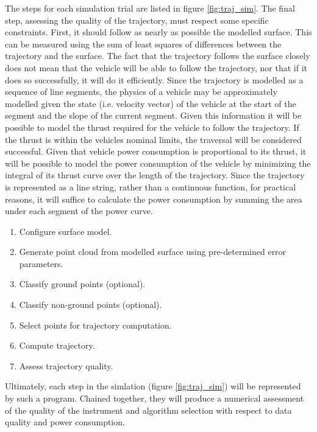 \documentclass[10pt]{report}
\begin{document}
The steps for each simulation trial are listed in figure \ref{fig:traj_sim}. The final step, assessing the quality of the trajectory, must respect some specific constraints. First, it should follow as nearly as possible the modelled surface. This can be measured using the sum of least squares of differences between the trajectory and the surface. The fact that the trajectory follows the surface closely does not mean that the vehicle will be able to follow the trajectory, nor that if it does so successfully, it will do it efficiently. Since the trajectory is modelled as a sequence of line segments, the physics of a vehicle may be approximately modelled given the state (i.e. velocity vector) of the vehicle at the start of the segment and the slope of the current segment. Given this information it will be possible to model the thrust required for the vehicle to follow the trajectory. If the thrust is within the vehicles nominal limits, the traversal will be considered successful. Given that vehicle power consumption is proportional to its thrust, it will be possible to model the power consumption of the vehicle by minimizing the integral of its thrust curve over the length of the trajectory. Since the trajectory is represented as a line string, rather than a continuous function, for practical reasons, it will suffice to calculate the power consumption by summing the area under each segment of the power curve.

\begin{enumerate}
\item Configure surface model.
\item Generate point cloud from modelled surface using pre-determined error parameters.
\item Classify ground points (optional).
\item Classify non-ground points (optional).
\item Select points for trajectory computation.
\item Compute trajectory.
\item Assess trajectory quality.
\label{fig:traj_sim}
\end{enumerate}

Ultimately, each step in the simlation (figure \ref{fig:traj_sim}) will be represented by such a program. Chained together, they will produce a numerical assessment of the quality of the instrument and algorithm selection with respect to data quality and power consumption.




\end{document}
